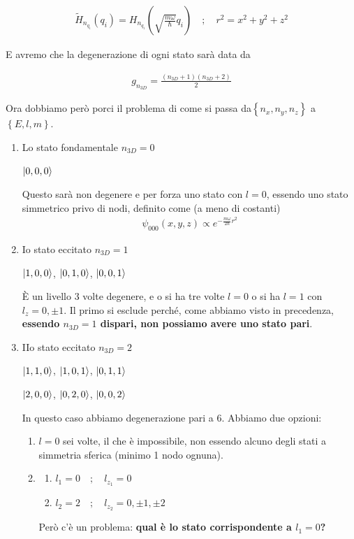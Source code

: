\begin{align}
\tilde{H}_{n_{q_i}}(q_i) = H_{n_{q_i}}\left( \sqrt{\frac{m\omega}{\hbar}} q_i\right) \quad ; \quad r^2 = x^2 + y^2 + z^2
\end{align}

E avremo che la degenerazione di ogni stato sarà data da

\begin{align}
g_{n_{3D}}= \frac{(n_{3D} + 1)(n_{3D} + 2)}{2}
\end{align}

Ora dobbiamo però porci il problema di come si passa da$\left\{n_x, n_y, n_z\right\}$ a $\left\{E,l,m\right\}$.

\begin{enumerate}
	\item Lo stato fondamentale $n_{3D}=0$ 
	
	$\ket{0,0,0}$
	
	Questo sarà non degenere e per forza uno stato con $l=0$, essendo uno stato simmetrico privo di nodi, definito come (a meno di costanti)
	\begin{align}
	\psi_{000}(x,y,z)\propto e^{-\frac{m\omega}{2\hbar}r^2} \nonumber
	\end{align}
	
	\item Io stato eccitato $n_{3D}=1$ 
	
	$\ket{1,0,0}$, $\ket{0,1,0}$, $\ket{0,0,1}$
	
	È un livello 3 volte degenere, e o si ha tre volte $l=0$ o si ha $l=1$ con $l_z= 0,\pm 1$. Il primo si esclude perché, come abbiamo visto in precedenza, \textbf{essendo $n_{3D}=1$ dispari, non possiamo avere uno stato pari}.
	
	\newpage
	
	\item IIo stato eccitato $n_{3D}=2$ 
	
	$\ket{1,1,0}$, $\ket{1,0,1}$, $\ket{0,1,1}$
	
	$\ket{2,0,0}$, $\ket{0,2,0}$, $\ket{0,0,2}$
	
	In questo caso abbiamo degenerazione pari a 6. Abbiamo due opzioni:
	
	\begin{enumerate}
		\item $l=0$ sei volte, il che è impossibile, non essendo alcuno degli stati a simmetria sferica (minimo 1 nodo ognuna).
		
		\item 
		\begin{enumerate}
			\item $l_1=0 \quad ; \quad l_{z_1}=0$
			\item $l_2=2  \quad ; \quad l_{z_2}=0,\pm 1, \pm 2$
		\end{enumerate}
		Però c'è un problema: \textbf{qual è lo stato corrispondente a $l_1=0$?}
		

\end{enumerate}
\end{enumerate}
